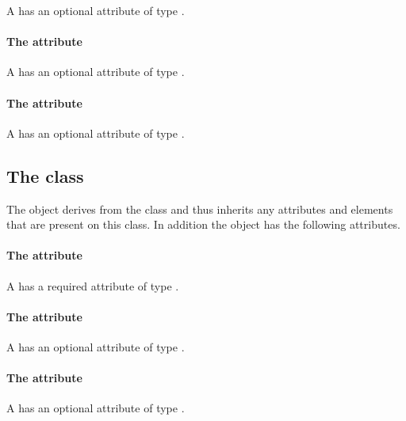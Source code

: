 A \RadialGradient has an optional attribute  of type
\RelAbsVector.

\paragraph{The \fixttspace{} attribute}

A \RadialGradient has an optional attribute  of type
\RelAbsVector.

\paragraph{The \fixttspace{} attribute}

A \RadialGradient has an optional attribute  of type
\RelAbsVector.

\subsection{The  class}
\label{renderrectangle-class}


The \RenderRectangle object derives from the
 class and thus inherits any attributes and
elements that are present on this class.
In addition the \RenderRectangle object has the following attributes.

\paragraph{The \fixttspace{} attribute}

A \RenderRectangle has a required attribute  of type
\RelAbsVector.

\paragraph{The \fixttspace{} attribute}

A \RenderRectangle has an optional attribute  of type
\RelAbsVector.

\paragraph{The \fixttspace{} attribute}

A \RenderRectangle has an optional attribute  of type
\RelAbsVector.

